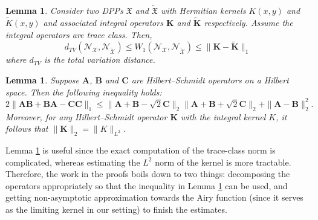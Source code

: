 \documentclass[11pt]{article}
\newtheorem{lemma}[theorem]{Lemma}
\numberwithin{equation}{section}%
\numberwithin{theorem}{section}
\begin{document}
\begin{lemma}\label{M and M}\cite[Lemma $1.1$]{cai2025mesoscopicratesconvergencehermitian}
	Consider two DPPs $\mathfrak{X}$ and $\widetilde{\mathfrak{X}}$ with Hermitian kernels $K(x,y)$ and $\widetilde{K}(x,y)$ and associated integral operators $\mathbf{K}$ and $\widetilde{\mathbf{K}}$ respectively. Assume the integral operators are trace class. Then,
	\begin{equation*}
	d_{TV}(\mathcal{N}_\mathcal{X},\mathcal{N}_{\tilde{\mathcal{X}}})\le W_1(\mathcal{N}_\mathcal{X},\mathcal{N}_{\tilde{\mathcal{X}}})
	\leq \lVert \mathbf{K} - \widetilde{\mathbf{K}} \rVert_1
	\end{equation*}
    where $d_{TV}$ is the total variation distance.
\end{lemma}
\begin{lemma}\label{21in}\cite[Lemma $3.1$]{cai2025mesoscopicratesconvergencehermitian}
    Suppose $\mathbf{A}$, $\mathbf{B}$ and $\mathbf{C}$ are Hilbert--Schmidt operators on a Hilbert space. Then the following inequality holds:
    \begin{equation*}
2\|\mathbf{A}\mathbf{B}+\mathbf{B}\mathbf{A}-\mathbf{C}\mathbf{C}\|_1\le\|\mathbf{A}+\mathbf{B}-\sqrt2\mathbf{C}\|_2\|\mathbf{A}+\mathbf{B}+\sqrt2\mathbf{C}\|_2+\|\mathbf{A}-\mathbf{B}\|^2_2.
    \end{equation*}
      Moreover, for any Hilbert--Schmidt operator $\mathbf{K}$ with the integral kernel $K$, it follows that $\|\mathbf{K}\|_2=\|K\|_{L^2}$.
\end{lemma}
Lemma \ref{21in} is useful since the exact computation of the trace-class norm is complicated, whereas estimating the $L^2$ norm of the kernel is more tractable.
Therefore, the work in the proofs boils down to two things: decomposing the operators appropriately so that the inequality in Lemma \ref{21in} can be used, and getting non-asymptotic approximation towards the Airy function (since it serves as the limiting kernel in our setting) to finish the estimates.
\end{document}
